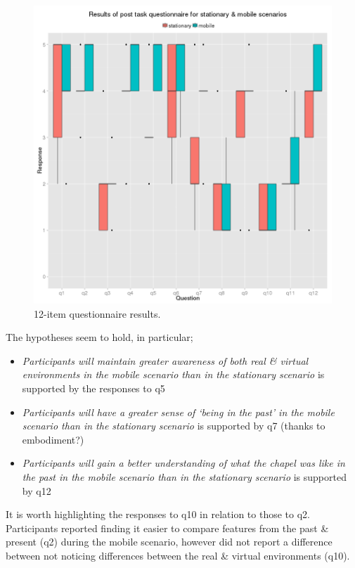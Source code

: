 \documentclass[oneside]{book}
\begin{document}
\begin{figure}[h]
	\begin{center}
		\includegraphics[width=0.9\linewidth]{images/post_task_questionnaire_boxplot.png}
		\caption{12-item questionnaire results.}
		\label{12-item_boxplot}
	\end{center}
\end{figure}

The hypotheses seem to hold, in particular;

\begin{itemize}
	\item \textit{Participants will maintain greater awareness of both real \& virtual environments in the mobile scenario than in the stationary scenario} is supported by the responses to q5
	\item \textit{Participants will have a greater sense of `being in the past' in the mobile scenario than in the stationary scenario} is supported by q7 (thanks to embodiment?)
	\item \textit{Participants will gain a better understanding of what the chapel was like in the past in the mobile scenario than in the stationary scenario} is supported by q12
\end{itemize}

It is worth highlighting the responses to q10 in relation to those to q2. Participants reported finding it easier to compare features from the past \& present (q2) during the mobile scenario, however did not report a difference between not noticing differences between the real \& virtual environments (q10).
\end{document}
